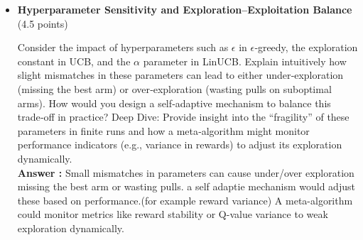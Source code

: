 \documentclass[12pt]{article}
\begin{document}
{{{\begin{itemize}[noitemsep]
    \vspace{0.25cm}
    Many algorithms (e.g., UCB) are analyzed using asymptotic (long‑term) regret bounds. In a finite‑horizon scenario (say, 500–1000 steps), explain intuitively why an algorithm that is asymptotically optimal may still yield poor performance. What trade‑offs arise between aggressive early exploration and cautious long‑term learning?
    Deep Dive:
    Discuss how the exploration bonus, tuned for asymptotic behavior, might delay exploitation in finite time, leading to high early regret despite eventual convergence.\\
    \textbf{Answer :} Altough UCB is optimal in the long run, its high exploration bonus early on delays exploitation and results in high regret over a small finit horizon. we should Balance aggressive early exploration with cautious long-term learning.
    Since UCB's bonus tuned for asymptotic behavior, even when the best arm is evident it forces extra sampling and means delaying the exploitation and higher early regret while too little exploration risks missing the optimal arm.
    \vspace{0.5cm}
    \item \textbf{Hyperparameter Sensitivity and Exploration–Exploitation Balance} (4.5 points)

    \vspace{0.25cm}
    Consider the impact of hyperparameters such as $\epsilon$ in $\epsilon$‑greedy, the exploration constant in UCB, and the $\alpha$ parameter in LinUCB. Explain intuitively how slight mismatches in these parameters can lead to either under‑exploration (missing the best arm) or over‑exploration (wasting pulls on suboptimal arms). How would you design a self‑adaptive mechanism to balance this trade‑off in practice?
    Deep Dive:
    Provide insight into the “fragility” of these parameters in finite runs and how a meta‑algorithm might monitor performance indicators (e.g., variance in rewards) to adjust its exploration dynamically.\\
    \textbf{Answer :} Small mismatches in parameters can cause under/over exploration missing the best arm or wasting pulls. a self adaptie mechanism would adjust these based on performance.(for example reward variance)
    A meta-algorithm could monitor metrics like reward stability or Q-value variance to weak exploration dynamically.

    \vspace{0.5cm}
    
    \newpage
    

\end{itemize}}}}
\end{document}
